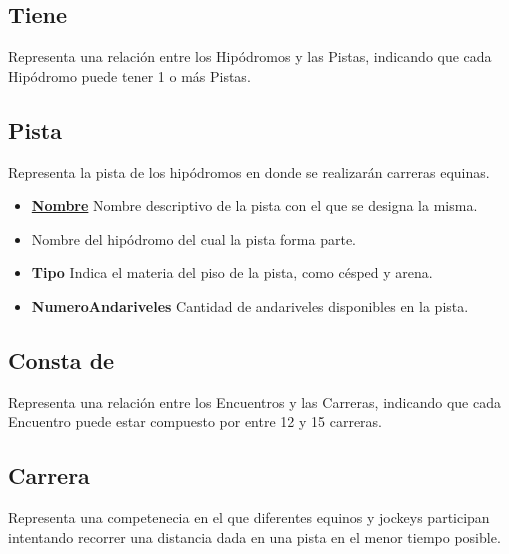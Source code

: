 \documentclass[a4paper,11pt]{article}
\begin{document}
\subsection{Tiene}

Representa una relación entre los Hipódromos y las Pistas, indicando que cada
Hipódromo puede tener 1 o más Pistas. 

\subsection{Pista}

Representa la pista de los hipódromos en donde se realizarán carreras equinas.

\begin{itemize}

  \item \textbf{\uline{Nombre}} Nombre descriptivo de la pista con el que se
    designa la misma.

  \item \textbf{\uline{}} Nombre del hipódromo del
    cual la pista forma parte.

  \item \textbf{Tipo} Indica el materia del piso de la pista, como césped y
    arena.

  \item \textbf{NumeroAndariveles} Cantidad de andariveles disponibles en la
    pista.

\end{itemize}

\subsection{Consta de}

Representa una relación entre los Encuentros y las Carreras, indicando que cada
Encuentro puede estar compuesto por entre 12 y 15 carreras.

\subsection{Carrera}

Representa una competenecia en el que diferentes equinos y jockeys participan
intentando recorrer una distancia dada en una pista en el menor tiempo posible.
\end{document}
